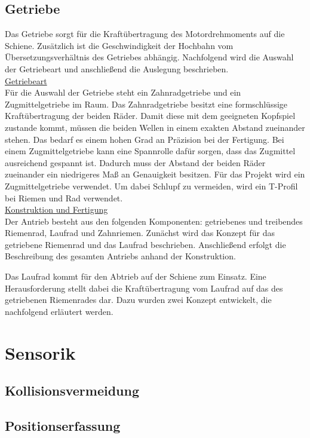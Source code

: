 \subsection{Getriebe}
Das Getriebe sorgt für die Kraftübertragung des Motordrehmoments auf die Schiene. Zusätzlich ist die Geschwindigkeit der Hochbahn vom Übersetzungsverhältnis des Getriebes abhängig. Nachfolgend wird die Auswahl der Getriebeart und anschließend die Auslegung beschrieben. \\

\underline{Getriebeart}\\
Für die Auswahl der Getriebe steht ein Zahnradgetriebe und ein Zugmittelgetriebe im Raum. Das Zahnradgetriebe besitzt eine formschlüssige Kraftübertragung der beiden Räder. Damit diese mit dem geeigneten Kopfspiel zustande kommt, müssen die beiden Wellen in einem exakten Abstand zueinander stehen. Das bedarf es einem hohen Grad an Präzision bei der Fertigung. Bei einem Zugmittelgetriebe kann eine Spannrolle dafür sorgen, dass das Zugmittel ausreichend gespannt ist. Dadurch muss der Abstand der beiden Räder zueinander ein niedrigeres Maß an Genauigkeit besitzen. 
Für das Projekt wird ein Zugmittelgetriebe verwendet. Um dabei Schlupf zu vermeiden, wird ein T-Profil bei Riemen und Rad verwendet. 
\\


\underline{Konstruktion und Fertigung}\\
Der Antrieb besteht aus den folgenden Komponenten: getriebenes und treibendes Riemenrad, Laufrad und Zahnriemen. Zunächst wird das Konzept für das getriebene Riemenrad und das Laufrad beschrieben. Anschließend erfolgt die Beschreibung des gesamten Antriebs anhand der Konstruktion.  

Das Laufrad kommt für den Abtrieb auf der Schiene zum Einsatz. Eine Herausforderung stellt dabei die Kraftübertragung vom Laufrad auf das des getriebenen Riemenrades dar. Dazu wurden zwei Konzept entwickelt, die nachfolgend erläutert werden. 




\section{Sensorik}
\subsection{Kollisionsvermeidung}
\subsection{Positionserfassung}
